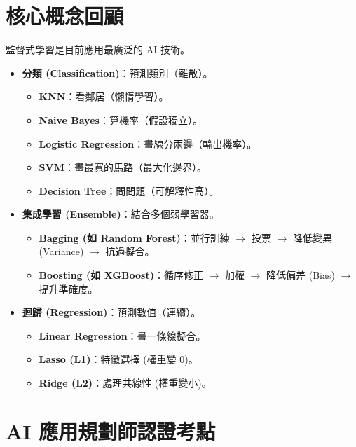 \documentclass[
  letterpaper,
  DIV=11,
  numbers=noendperiod]{scrreprt}
\providecommand{\tightlist}{%
  \setlength{\itemsep}{0pt}\setlength{\parskip}{0pt}}
\begin{document}
\section{核心概念回顧}\label{ux6838ux5fc3ux6982ux5ff5ux56deux9867-4}

監督式學習是目前應用最廣泛的 AI 技術。

\begin{itemize}
\tightlist
\item
  \textbf{分類 (Classification)}：預測類別（離散）。

  \begin{itemize}
  \tightlist
  \item
    \textbf{KNN}：看鄰居（懶惰學習）。
  \item
    \textbf{Naive Bayes}：算機率（假設獨立）。
  \item
    \textbf{Logistic Regression}：畫線分兩邊（輸出機率）。
  \item
    \textbf{SVM}：畫最寬的馬路（最大化邊界）。
  \item
    \textbf{Decision Tree}：問問題（可解釋性高）。
  \end{itemize}
\item
  \textbf{集成學習 (Ensemble)}：結合多個弱學習器。

  \begin{itemize}
  \tightlist
  \item
    \textbf{Bagging (如 Random Forest)}：並行訓練 \(\rightarrow\) 投票
    \(\rightarrow\) 降低變異 (Variance) \(\rightarrow\) 抗過擬合。
  \item
    \textbf{Boosting (如 XGBoost)}：循序修正 \(\rightarrow\) 加權
    \(\rightarrow\) 降低偏差 (Bias) \(\rightarrow\) 提升準確度。
  \end{itemize}
\item
  \textbf{迴歸 (Regression)}：預測數值（連續）。

  \begin{itemize}
  \tightlist
  \item
    \textbf{Linear Regression}：畫一條線擬合。
  \item
    \textbf{Lasso (L1)}：特徵選擇 (權重變 0)。
  \item
    \textbf{Ridge (L2)}：處理共線性 (權重變小)。
  \end{itemize}
\end{itemize}

\section{AI
應用規劃師認證考點}\label{ai-ux61c9ux7528ux898fux5283ux5e2bux8a8dux8b49ux8003ux9ede-4}
\end{document}
